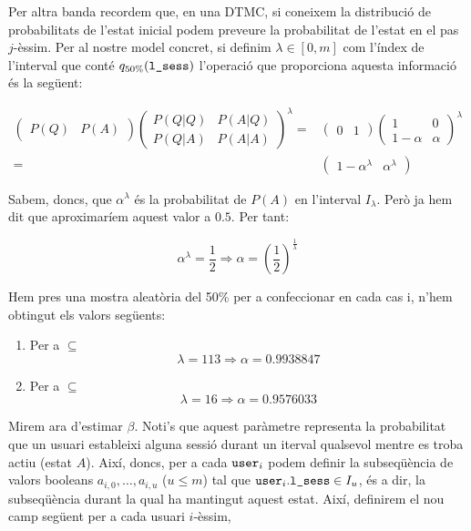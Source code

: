\documentclass[
	a4paper,
	twoside,
	justified
]{tufte-book}
\begin{document}
Per altra banda recordem que, en una DTMC, si coneixem la distribució de probabilitats de l'estat inicial podem preveure la probabilitat de l'estat en el pas $j$-èssim. Per al nostre model concret, si definim $\lambda \in [0,m]$ com l'índex de l'interval que conté ${q_{50\%}(\texttt{l\_sess})}$ l'operació que proporciona aquesta informació és la següent:    

\begin{align*}
\begin{pmatrix}
P(Q) & P(A)
\end{pmatrix}
\begin{pmatrix}
P(Q|Q) & P(A|Q) \\
P(Q|A) & P(A|A)
\end{pmatrix}^\lambda
 = & 
\begin{pmatrix}
0 & 1
\end{pmatrix}
\begin{pmatrix}
1 & 0 \\
1 - \alpha & \alpha
\end{pmatrix}^\lambda
\\
= &
\begin{pmatrix}
1-\alpha^\lambda & \alpha^\lambda
\end{pmatrix}
\end{align*}   

Sabem, doncs, que $\alpha^{\lambda}$ és la probabilitat de $P(A)$ en l'interval $I_{\lambda}$. Però ja hem dit que aproximaríem aquest valor a $0.5$. Per tant:

$$
 \alpha^{\lambda} = \frac{1}{2} \Rightarrow \alpha = \left(\frac{1}{2}\right)^{\frac{1}{\lambda}} 	
$$

Hem pres una mostra aleatòria del 50\% per a confeccionar  en cada cas i, n'hem obtingut els valors següents:

\begin{enumerate}
	\item Per a  $\subseteq$ 
		$$
			\lambda = 113 \Rightarrow \alpha = 0.9938847
		$$ 
	\item Per a  $\subseteq$ 	
		$$
			\lambda = 16 \Rightarrow \alpha = 0.9576033
		$$
\end{enumerate}

Mirem ara d'estimar $\beta$. Noti's que aquest paràmetre representa la probabilitat que un usuari estableixi alguna sessió durant un iterval qualsevol mentre es troba actiu (estat $A$). Així, doncs, per a cada $\texttt{user}_i$ podem definir la subseqüència de valors booleans $a_{i,0},\ldots,a_{i,u}$ ($u \leq m$) tal que $\texttt{user}_i.\texttt{l\_sess} \in I_u$, és a dir, la subseqüència durant la qual ha mantingut aquest estat. Així, definirem el nou camp següent per a cada usuari $i$-èssim, 
\end{document}
